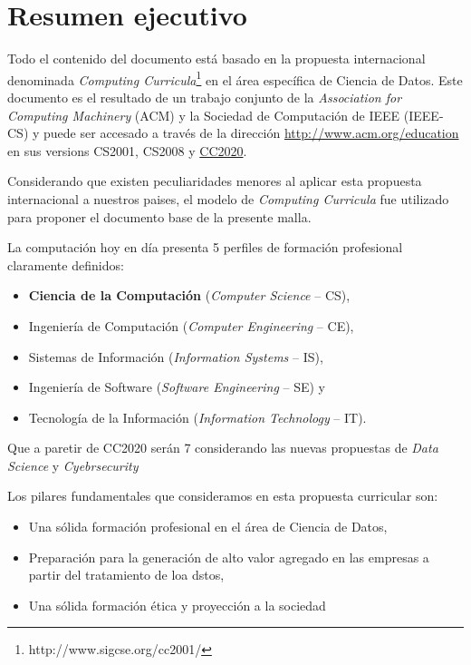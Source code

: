  \chapter*{Resumen ejecutivo}
\AbstractIntro

Todo el contenido del documento está basado en la propuesta internacional denominada \textit{Computing Curricula}\footnote{http://www.sigcse.org/cc2001/} 
en el área específica de Ciencia de Datos. Este documento es el resultado de un trabajo conjunto de la 
\textit{Association for Computing Machinery} (ACM) y la Sociedad de Computación de IEEE (IEEE-CS) y 
puede ser accesado a través de la dirección \href{http://www.acm.org/education}{http://www.acm.org/education} 
en sus versions CS2001, CS2008 y \href{cs2020.net}{CC2020}.

Considerando que existen peculiaridades menores al aplicar esta propuesta internacional a nuestros paises, el modelo de \textit{Computing Curricula} 
fue utilizado para proponer el documento base de la presente malla. 

\noindent La computación hoy en día presenta 5 perfiles de formación profesional claramente definidos: 
\begin{itemize}
\item \textbf{Ciencia de la Computación} (\textit{Computer Science} -- CS),
\item Ingeniería de Computación (\textit{Computer Engineering} -- CE),
\item Sistemas de Información (\textit{Information Systems} -- IS),
\item Ingeniería de Software (\textit{Software Engineering} -- SE) y 
\item Tecnología de la Información (\textit{Information Technology} -- IT).
\end{itemize}

Que a paretir de CC2020 serán 7 considerando las nuevas propuestas de {\it Data Science} y {\it Cyebrsecurity} 

Los pilares fundamentales que consideramos en esta propuesta curricular son:
\begin{itemize}
\item Una sólida formación profesional en el área de Ciencia de Datos,
\item Preparación para la generación de alto valor agregado en las empresas a partir del tratamiento de loa dstos,
\item Una sólida formación ética y proyección a la sociedad
\end{itemize}

